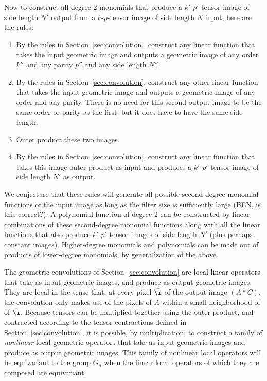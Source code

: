 \documentclass{article}
\theoremstyle{plain}
\newcommand{\sectionname}{Section}
\newcommand{\secref}[1]{\sectionname~\ref{#1}}
\begin{document}
Now to construct all degree-2 monomials that produce a $k'$-$p'$-tensor image of side length $N'$ output from a $k$-$p$-tensor image of side length $N$ input, here are the rules:
\begin{enumerate}
    \item By the rules in \secref{sec:convolution}, construct any linear function that takes the input geometric image and outputs a geometric image of any order $k''$ and any parity $p''$ and any side length $N''$.
    \item By the rules in \secref{sec:convolution}, construct any other linear function that takes the input geometric image and outputs a geometric image of any order and any parity.
    There is no need for this second output image to be the same order or parity as the first, but it does have to have the same side length.
    \item Outer product these two images.
    \item By the rules in \secref{sec:convolution}, construct any linear function that takes this image outer product as input and produces a $k'$-$p'$-tensor image of side length $N'$ as output.
\end{enumerate}

We conjecture that these rules will generate all possible second-degree monomial functions of the input image as long as the filter size is sufficiently large (BEN, is this correct?). A polynomial function of degree 2 can be constructed by linear combinations of these second-degree monomial functions along with all the linear functions that also produce $k'$-$p'$-tensor images of side length $N'$ (plus perhaps constant images).
Higher-degree monomials and polynomials can be made out of products of lower-degree monomials, by generalization of the above.


The geometric convolutions of \secref{sec:convolution} are local linear operators that take as input geometric images, and produce as output geometric images.
They are local in the sense that, at every pixel $\bar\i$ of the output image $(A\ast C)$, the convolution only makes use of the pixels of $A$ within a small neighborhood of of $\bar\i$.
Because tensors can be multiplied together using the outer product, and contracted according to the tensor contractions defined in \secref{sec:convolution}, it is possible, by multiplication, to construct a family of \emph{nonlinear} local geometric operators that take as input geometric images and produce as output geometric images.
This family of nonlinear local operators will be equivariant to the group $G_d$ when the linear local operators of which they are composed are equivariant.
\end{document}
